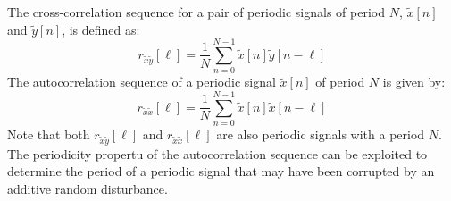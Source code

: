 \documentclass[../../main/main.tex]{subfiles}
\begin{document}
\medskip
{}
The cross-correlation sequence for a pair of periodic signals of period \( N \), \( \tilde{x}[n] \) and \( \tilde{y}[n] \), is defined as:
\begin{equation}
    r_{\tilde{x}\tilde{y}}[\ell]
    =
    \frac{1}{N} \sum_{n=0}^{N-1} \tilde{x}[n] \tilde{y}[n-\ell]
    \label{eq:L06_S44_1}
\end{equation}
The autocorrelation sequence of a periodic signal \( \tilde{x}[n] \) of period \( N \) is given by:
\begin{equation}
    r_{\tilde{x}\tilde{x}}[\ell]
    =
    \frac{1}{N} \sum_{n=0}^{N-1} \tilde{x}[n] \tilde{x}[n-\ell]
    \label{eq:L06_S44_2}
\end{equation}
Note that both \( r_{\tilde{x}\tilde{y}}[\ell] \) and \( r_{\tilde{x}\tilde{x}}[\ell] \) are also periodic signals with a period \( N \). The periodicity propertu of the autocorrelation sequence can be exploited to determine the period of a periodic signal that may have been corrupted by an additive random disturbance.
\end{document}
